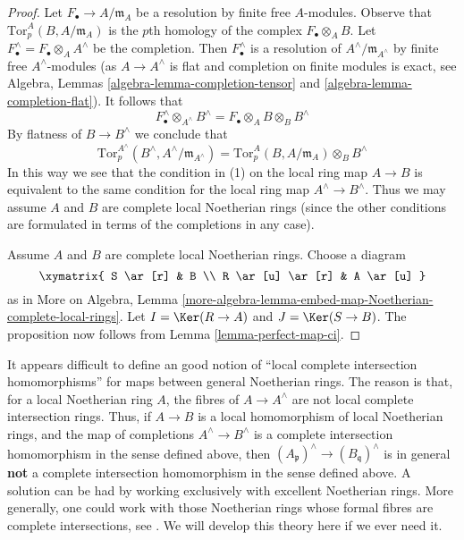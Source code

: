 \begin{proof}
Let $F_\bullet \to A/\mathfrak m_A$ be a resolution by finite
free $A$-modules. Observe that
$\text{Tor}^A_p(B, A/\mathfrak m_A)$
is the $p$th homology of the complex $F_\bullet \otimes_A B$.
Let $F_\bullet^\wedge = F_\bullet \otimes_A A^\wedge$ be the completion.
Then $F_\bullet^\wedge$ is a resolution of $A^\wedge/\mathfrak m_{A^\wedge}$
by finite free $A^\wedge$-modules (as $A \to A^\wedge$ is flat and completion
on finite modules is exact, see
Algebra, Lemmas \ref{algebra-lemma-completion-tensor} and
\ref{algebra-lemma-completion-flat}).
It follows that
$$
F_\bullet^\wedge \otimes_{A^\wedge} B^\wedge =
F_\bullet \otimes_A B \otimes_B B^\wedge
$$
By flatness of $B \to B^\wedge$ we conclude that
$$
\text{Tor}^{A^\wedge}_p(B^\wedge, A^\wedge/\mathfrak m_{A^\wedge}) =
\text{Tor}^A_p(B, A/\mathfrak m_A) \otimes_B B^\wedge
$$
In this way we see that the condition in (1) on the local ring map $A \to B$
is equivalent to the same condition for the local ring map
$A^\wedge \to B^\wedge$.
Thus we may assume $A$ and $B$ are complete local Noetherian rings
(since the other conditions are formulated in terms of the completions
in any case).

\medskip\noindent
Assume $A$ and $B$ are complete local Noetherian rings.
Choose a diagram
$$
\xymatrix{
S \ar[r] & B \\
R \ar[u] \ar[r] & A \ar[u]
}
$$
as in More on Algebra, Lemma
\ref{more-algebra-lemma-embed-map-Noetherian-complete-local-rings}.
Let $I = \Ker(R \to A)$ and $J = \Ker(S \to B)$.
The proposition now follows from Lemma \ref{lemma-perfect-map-ci}.
\end{proof}

\begin{remark}
\label{remark-no-good-ci-map}
It appears difficult to define an good notion of ``local complete
intersection homomorphisms'' for maps between general Noetherian rings.
The reason is that, for a local Noetherian ring $A$, the fibres of
$A \to A^\wedge$ are not local complete intersection rings.
Thus, if $A \to B$ is a local homomorphism of local Noetherian rings,
and the map of completions $A^\wedge \to B^\wedge$ is a
complete intersection homomorphism in the sense defined above,
then $(A_\mathfrak p)^\wedge \to (B_\mathfrak q)^\wedge$ is in general
{\bf not} a complete intersection homomorphism in the sense
defined above. A solution can be had by working exclusively with
excellent Noetherian rings. More generally, one could work with
those Noetherian rings whose formal fibres are complete
intersections, see \cite{Rodicio-ci}.
We will develop this theory here if we ever need it.
\end{remark}

